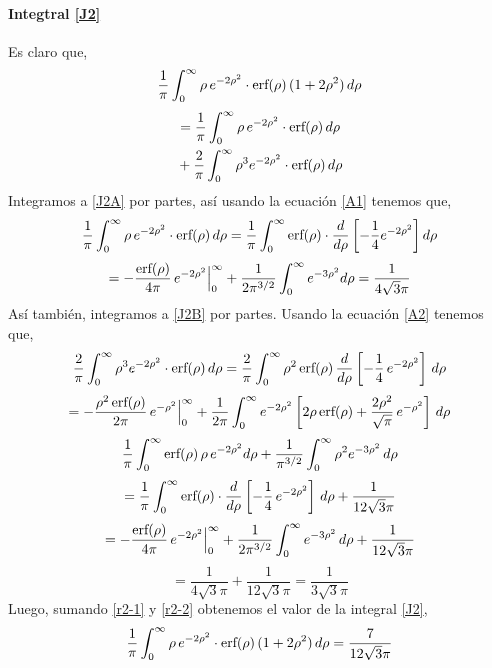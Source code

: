 \documentclass[12pt]{book}
\numberwithin{equation}{chapter}
\def\r{\rho}
\def\erf{\hbox{erf}}
\begin{document}
\paragraph{Integtral \eqref{J2}}
Es claro que,
$$ \frac{1}{\pi} \int_{0}^{\infty} \r \, e^{-2\r^{2}} \cdot \erf(\r)\, ( 1+2\r^{2})\, d\r $$
\begin{subequations}
\begin{align}
&=\frac{1}{\pi} \int_{0}^{\infty} \r \, e^{-2\r^{2}} \cdot \erf(\r)\,d\r \label{J2A}\\
&+\frac{2}{\pi} \int_{0}^{\infty} \r^{3} e^{-2\r^{2}} \cdot \erf(\r)\,d\r \label{J2B}
\end{align}
\end{subequations}
Integramos a \eqref{J2A} por partes, as\'i usando la ecuaci\'on \eqref{A1} tenemos que,
$$ \frac{1}{\pi} \int_{0}^{\infty} \r \, e^{-2\r^{2}} \cdot \erf(\r)\,d\r= \frac{1}{\pi} \int_{0}^{\infty} \erf(\r) \cdot \frac{d}{d\r} \left[ -\frac{1}{4} e^{-2\r^{2}} \right] d\r $$
\begin{equation}\label{r2-1}
=-\frac{\erf(\r)}{4\pi}\, e^{-2\r^{2}} \Big|_{0}^{\infty} + \frac{1}{2\pi^{3/2}} \int_{0}^{\infty} e^{-3\r^{2}} d\r = \frac{1}{4\sqrt{3}\pi}
\end{equation}
As\'i tambi\'en, integramos a \eqref{J2B} por partes. Usando la ecuaci\'on \eqref{A2} tenemos que,
$$ \frac{2}{\pi} \int_{0}^{\infty} \r^{3} e^{-2\r^{2}} \cdot \erf(\r)\,d\r= \frac{2}{\pi} \int_{0}^{\infty} \r^{2}\, \erf(\r)\,\frac{d}{d\r} \left[ -\frac{1}{4}\, e^{-2\r^{2}} \right]\, d\r $$
$$ = -\frac{\r^{2}\,\erf(\r)}{2\pi}\, e^{-\r^{2}} \Big|_{0}^{\infty} + \frac{1}{2\pi} \int_{0}^{\infty} e^{-2\r^{2}} \left[ 2\r\,\erf(\r)+\frac{2\r^{2}}{\sqrt{\pi}}\, e^{-\r^{2}} \right]\, d\r  $$
$$ \frac{1}{\pi} \int_{0}^{\infty} \erf(\r)\, \r\,e^{-2\r^{2}} d\r + \frac{1}{\pi^{3/2}} \int_{0}^{\infty} \r^{2} e^{-3\r^{2}}\, d\r $$
$$ = \frac{1}{\pi} \int_{0}^{\infty} \erf(\r) \cdot \frac{d}{d\r}\left[ -\frac{1}{4}\, e^{-2\r^{2}} \right]\, d\r + \frac{1}{12\sqrt{3}\pi}  $$
$$= -\frac{\erf(\r)}{4\pi}\, e^{-2\r^{2}} \Big|_{0}^{\infty} +\frac{1}{2\pi^{3/2}}\int_{0}^{\infty} e^{-3\r^{2}}\, d\r  + \frac{1}{12\sqrt{3}\pi} $$
\begin{equation}\label{r2-2}
= \frac{1}{4\sqrt{3}\pi}+ \frac{1}{12\sqrt{3}\pi} = \frac{1}{3\sqrt{3}\pi}
\end{equation}
Luego, sumando \eqref{r2-1} y \eqref{r2-2} obtenemos el valor de la integral \eqref{J2},
\begin{equation}\label{Jr2}
\frac{1}{\pi} \int_{0}^{\infty} \r \, e^{-2\r^{2}} \cdot \erf(\r)\, ( 1+2\r^{2})\, d\r= \frac{7}{12\sqrt{3}\pi}
\end{equation}
\end{document}
